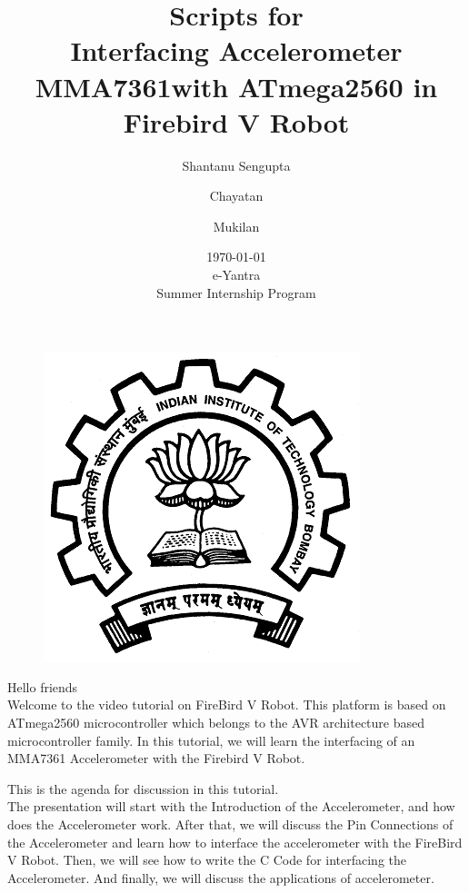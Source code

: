 \documentclass[a4paper,12 pt]{article}
\begin{document}
\begin{figure}[t]
\begin{center}
\includegraphics[]{iitb.png}
\end{center}
\end{figure}
\title{\textbf{Scripts for \\ Interfacing Accelerometer MMA7361with ATmega2560 in Firebird V Robot}}
\author{Shantanu Sengupta \and Chayatan \and Mukilan}
\date{\today \\ e-Yantra \\ Summer Internship Program   }
\maketitle

\pagebreak
\tableofcontents
\pagebreak

Hello friends\\
Welcome to the video tutorial on FireBird V Robot. This platform is based on ATmega2560 microcontroller which belongs to the AVR architecture based microcontroller family. In this tutorial, we will learn the interfacing of an MMA7361 Accelerometer with the Firebird V Robot.

This is the agenda for discussion in this tutorial.\\
The presentation will start with the Introduction of the Accelerometer, and how does the Accelerometer work.
After that, we will discuss the Pin Connections of the Accelerometer and learn how to interface the accelerometer with the FireBird V Robot.
Then, we will see how to write the C Code for interfacing the Accelerometer.
And finally, we will discuss the applications of accelerometer.
\end{document}
